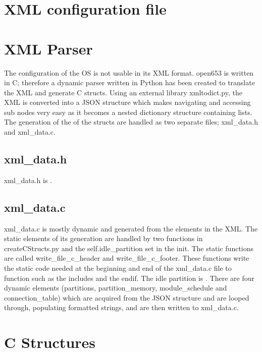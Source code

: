 \section{XML configuration file}

\section{XML Parser}

The configuration of the OS is not usable in its XML format. open653 is written in C; therefore a dynamic parser written in Python has been created to translate the XML and generate C structs.
Using an external library xmltodict.py, the XML is converted into a JSON structure which makes navigating and accessing sub nodes very easy as it becomes a nested dictionary structure containing lists.
The generation of the of the structs are handled as two separate files; xml\_data.h and xml\_data.c. 

\subsection{xml\_data.h}

xml\_data.h is .

\subsection{xml\_data.c}

xml\_data.c is mostly dynamic and generated from the elements in the XML. 
The static elements of its generation are handled by two functions in createCStructs.py and the self.idle\_partition set in the init. The static functions are called write\_file\_c\_header and write\_file\_c\_footer. These functions write the static code needed at the beginning and end of the xml\_data.c file to function such as the includes and the endif. 
The idle partition is .
There are four dynamic elements (partitions, partition\_memory, module\_schedule and connection\_table) which are acquired from the JSON structure and are looped through, populating formatted strings, and are then written to xml\_data.c.

\section{C Structures}

